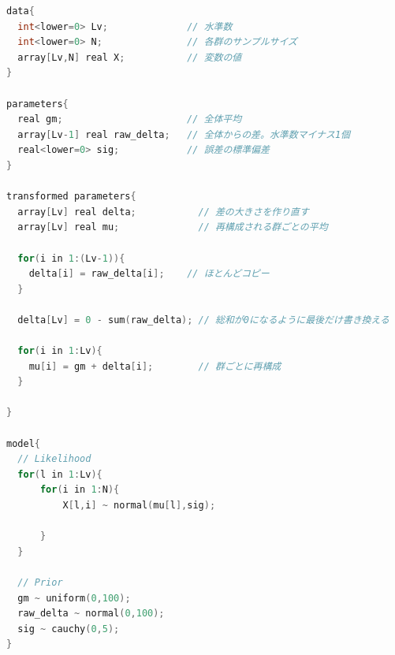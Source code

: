 \documentclass{ltjsbook}
\begin{document}
\begin{lstlisting}[language=C++,label={stan:08_05},caption={群の数を一般化したコード}]
data{
  int<lower=0> Lv;              // 水準数
  int<lower=0> N;               // 各群のサンプルサイズ       
  array[Lv,N] real X;           // 変数の値
}

parameters{
  real gm;                      // 全体平均
  array[Lv-1] real raw_delta;   // 全体からの差。水準数マイナス1個
  real<lower=0> sig;            // 誤差の標準偏差
}

transformed parameters{
  array[Lv] real delta;           // 差の大きさを作り直す
  array[Lv] real mu;              // 再構成される群ごとの平均
  
  for(i in 1:(Lv-1)){
    delta[i] = raw_delta[i];    // ほとんどコピー
  }
  
  delta[Lv] = 0 - sum(raw_delta); // 総和が0になるように最後だけ書き換える

  for(i in 1:Lv){
    mu[i] = gm + delta[i];        // 群ごとに再構成
  }
  
}

model{
  // Likelihood
  for(l in 1:Lv){
      for(i in 1:N){
          X[l,i] ~ normal(mu[l],sig);
          
      }
  }
    
  // Prior
  gm ~ uniform(0,100);
  raw_delta ~ normal(0,100);
  sig ~ cauchy(0,5);
}

\end{lstlisting}
\end{document}
